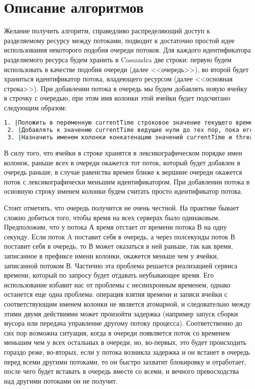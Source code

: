\section{Описание алгоритмов}

Желание получить алгоритм, справедливо распределяющий доступ к разделяемому ресурсу между потоками, подводит к достаточно простой идее использования некоторого подобия очереди потоков.
Для каждого идентификатора разделяемого ресурса будем хранить в Cassandra две строки: первую будем использовать в качестве подобия очереди (далее <<очередь>>), во второй будет храниться идентификатор потока, владеющего ресурсом (далее <<основная строка>>).
При добавлении потока в очередь мы будем добавлять новую ячейку в строчку с очередью, при этом имя колонки этой ячейки будет подсчитано следующим образом:

\begin{lstlisting}[language=csh,caption={Определение имени колонки для ячейки в очереди}]
 1. |Положить в переменную currentTime строковое значение текущего времени в микросекундах|
 2. |Добавлять к значению currentTime ведущие нули до тех пор, пока его длина не станет равной 20|
 3. |Назначить именем колонки конкатенацию значений currentTime и threadId|
\end{lstlisting}

В силу того, что ячейки в строке хранятся в лексикографическом порядке имен колонок, раньше всех в очереди окажется тот поток, который будет добавлен в очередь раньше, в случае равенства времен ближе к вершине очереди окажется поток с лексикографически меньшим идентификатором.
При добавлении потока в основную строку именем колонки будем считать просто идентификатор потока.

Стоит отметить, что очередь получится не очень честной. На практике бывает сложно добиться того, чтобы время на всех серверах было одинаковым. Предположим, что у потока А время отстает от времени потока В на одну секунду. Если поток A поставит себя в очередь, а через полсекунды поток В поставит себя в очередь, то В может оказаться в ней раньше, так как время, записанное в префиксе имени колонки, окажется меньше чем у ячейки, записанной потоком В. Частично эта проблема решается реализацией сервиса времени, который по запросу будет отдавать неубывающее время. Его использование избавит нас от проблемы с несинхронным временем, однако останется еще одна проблема: операция взятия времени и записи ячейки с соответствующим именем колонки не является атомарной, и следовательно между этими двумя действиями может произойти задержка (например запуск сборки мусора или передача управление другому потоку процесса). Соответственно до сих пор возможна ситуация, когда в очереди появляется поток со временем меньшим чем у всех остальных в очереди, но, во-первых, это будет происходить гораздо реже, во-вторых, если у потока возникла задержка и он встанет в очередь перед всеми другими потоками, то он быстро захватит блокировку и отработает, после чего будет вставать в очередь вместе со всеми, и вечного превосходства над другими потоками он не получит.
